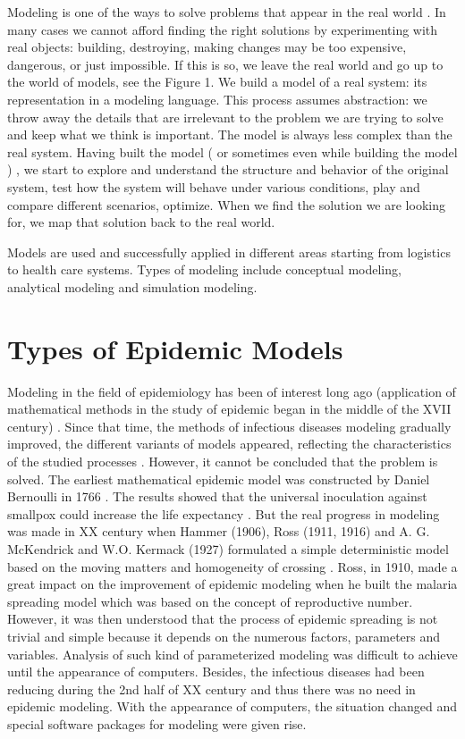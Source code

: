 Modeling is one of the ways to solve problems that appear in the real world \cite{per9}. In many cases we cannot afford finding the right solutions by experimenting   with real objects:  building, destroying, making changes may be too expensive, dangerous, or just impossible. If this is so, we leave the real world and go up to the world of models, see the Figure 1. We build a model of a real system: its representation in a modeling language. This process assumes abstraction: we throw away the details that are irrelevant to the problem we are trying to solve and keep what we think is important. The model is always less complex than the real system. Having built the model ( or sometimes  even while building the model ) , we  start to explore and understand the structure and behavior of the original system, test how the system will behave under various conditions, play  and compare different scenarios, optimize.  When we find the solution we are looking for, we map that solution back to the real world.

Models are used and successfully applied in different areas starting from logistics to health care systems. Types of modeling include conceptual modeling, analytical modeling and simulation modeling.

\section{Types of Epidemic Models}

Modeling in the field of epidemiology has been of interest long ago (application of mathematical methods in the study of epidemic began in the middle of the XVII century) \cite{per12}. Since that time, the methods of infectious diseases modeling gradually improved, the different variants of models appeared, reflecting the characteristics of the studied processes \cite{per12}. However, it cannot be concluded that the problem is solved. The earliest mathematical epidemic model was constructed by Daniel Bernoulli in 1766 \cite{per13}. The results showed that the universal inoculation against smallpox could increase the life expectancy \cite{per13}. But the real progress in modeling was made in XX century when Hammer (1906), Ross (1911, 1916) and A. G. McKendrick and W.O. Kermack (1927) formulated a simple deterministic model based on the moving matters and homogeneity of crossing \cite{per13}. Ross, in 1910, made a great impact on the improvement of epidemic modeling when he built the malaria spreading model which was based on the concept of reproductive number. However, it was then understood that the process of epidemic spreading is not trivial and simple because it depends on the numerous factors, parameters and variables. Analysis of such kind of parameterized modeling was difficult to achieve until the appearance of computers. Besides, the infectious diseases had been reducing during the 2nd half of XX century and thus there was no need in epidemic modeling. With the appearance of computers, the situation changed and special software packages for modeling were given rise.

